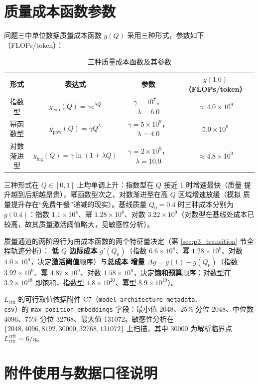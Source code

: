 \section{质量成本函数参数}

问题三中单位数据质量成本函数 $g(Q)$ 采用三种形式，参数如下（FLOPs/token）：

\begin{table}[htbp]
\centering
\caption{三种质量成本函数及其参数}
\begin{tabular}{c|cc|c}
\toprule
形式 & 表达式 & 参数 & $g(1.0)$（FLOPs/token） \\
\midrule
指数型 & $g_{\text{exp}}(Q)=\gamma e^{\lambda Q}$ & $\gamma=10^{7}$，$\lambda=6.0$ & $\approx4.0\times10^{9}$ \\
幂函数型 & $g_{\text{pow}}(Q)=\gamma Q^{\lambda}$ & $\gamma=5\times10^{9}$，$\lambda=4.0$ & $5.0\times10^{9}$ \\
对数渐进型 & $g_{\log}(Q)=\gamma\ln(1+\lambda Q)$ & $\gamma=2\times10^{9}$，$\lambda=10.0$ & $\approx4.8\times10^{9}$ \\
\bottomrule
\end{tabular}
\end{table}

三种形式在 $Q\in[0,1]$ 上均单调上升：指数型在 $Q$ 接近 1 时增速最快（质量
提升越到后期越昂贵），幂函数型次之，对数渐进型在高 $Q$ 区域增速放缓（模拟
质量提升存在``免费午餐''递减的现实）。基线质量 $Q_0=0.4$ 时三种成本分别为
$g(0.4)$：指数 $1.1\times10^{8}$、幂 $1.28\times10^{8}$、对数 $3.22\times
10^{9}$（对数型在基线处成本已较高，故其质量激活阈值略大，见敏感性分析）。

质量通道的两阶段行为由成本函数的两个特征量决定（第 \ref{sec:p3_transition} 节全程轨迹分析）：
\textbf{低 $Q$ 边际成本} $g'(Q_0)$（指数 $6.6\times10^{8}$、幂 $1.28\times
10^{9}$、对数 $4.0\times10^{9}$，决定\textbf{激活阈值}顺序）与\textbf{总成本
增量} $\Delta g=g(1)-g(Q_0)$（指数 $3.92\times10^{9}$、幂 $4.87\times
10^{9}$、对数 $1.58\times10^{9}$，决定\textbf{饱和预算}顺序：对数型在
$3.2\times10^{18}$ 即饱和，指数型 $1.8\times10^{20}$、幂型 $8.9\times10^{19}$）。

$L_{\text{ctx}}$ 的可行取值依据附件 C7（\texttt{model\_architecture\_metadata.\\ csv}）的 \texttt{max\_position\_embeddings} 字段：最小值 2048、25\% 分位
2048、中位数 4096、75\% 分位 32768、最大值 131072。敏感性分析在
$\{2048,4096,8192,30000,32768,131072\}$ 上扫描，其中 30000 为解析临界点
$L_{\text{ctx}}^{\text{crit}}=6/\eta$。

\section{附件使用与数据口径说明}

